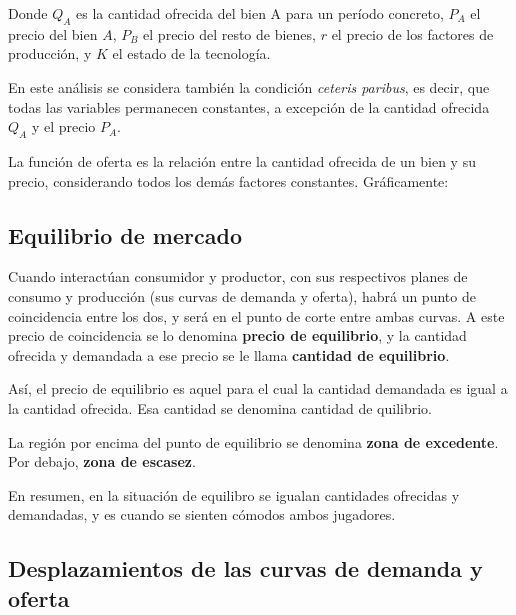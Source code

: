 Donde \(Q_A\) es la cantidad ofrecida del bien A para un período concreto,
\(P_A\) el precio del bien \(A\),
\(P_B\) el precio del resto de bienes,
\(r\) el precio de los factores de producción,
y \(K\) el estado de la tecnología.

En este análisis se considera también la condición \textit{ceteris paribus},
es decir,
que todas las variables permanecen constantes,
a excepción de la cantidad ofrecida \(Q_A\) y el precio \(P_A\).

La función de oferta es la relación entre la cantidad ofrecida de un bien y su precio,
considerando todos los demás factores constantes.
Gráficamente:

\begin{center}
\end{center}

\subsection{Equilibrio de mercado}

Cuando interactúan consumidor y productor,
con sus respectivos planes de consumo y producción
(sus curvas de demanda y oferta),
habrá un punto de coincidencia entre los dos,
y será en el punto de corte entre ambas curvas.
A este precio de coincidencia se lo denomina \textbf{precio de equilibrio},
y la cantidad ofrecida y demandada a ese precio se le llama \textbf{cantidad de equilibrio}.

Así,
el precio de equilibrio es aquel para el cual la cantidad demandada es igual a la cantidad ofrecida.
Esa cantidad se denomina cantidad de quilibrio.

La región por encima del punto de equilibrio se denomina \textbf{zona de excedente}.
Por debajo, \textbf{zona de escasez}.

En resumen,
en la situación de equilibro se igualan cantidades ofrecidas y demandadas,
y es cuando se sienten cómodos ambos jugadores.

\subsection{Desplazamientos de las curvas de demanda y oferta}

